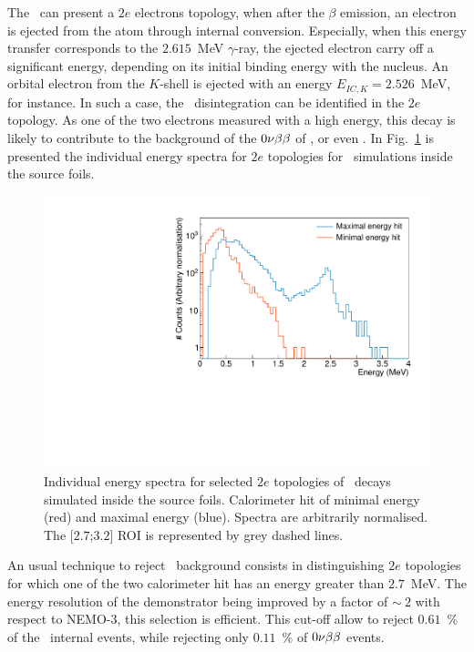 The \Tl\ can present a $2e$ electrons topology, when after the $\beta$ emission, an electron is ejected from the atom through internal conversion.
Especially, when this energy transfer corresponds to the $2.615$~MeV $\gamma$-ray, the ejected electron carry off a significant energy, depending on its initial binding energy with the nucleus.
An orbital electron from the $K$-shell is ejected with an energy $E_{IC,K}=2.526$~MeV, for instance.
In such a case, the \Tl\ disintegration can be identified in the $2e$ topology.
As one of the two electrons measured with a high energy, this decay is likely to contribute to the background of the $0\nu\beta\beta$ of \Se, or even \Nd.
In Fig.~\ref{fig:Emin_Emax_Tl} is presented the individual energy spectra for $2e$ topologies for \Tl\ simulations inside the source foils.
\begin{figure}[!h]
  \centering
  \includegraphics[width=13cm]{timedifference/fig_timediff/energy_spect_min_max_208Tl.pdf}
  \caption{Individual energy spectra for selected $2e$ topologies of \Tl\ decays simulated inside the source foils.
    Calorimeter hit of minimal energy (red) and maximal energy (blue).
    Spectra are arbitrarily normalised.
    The [$2.7$;$3.2$] ROI is represented by grey dashed lines.
    \label{fig:Emin_Emax_Tl}}
\end{figure}
An usual technique to reject \Tl\ background consists in distinguishing $2e$ topologies for which one of the two calorimeter hit has an energy greater than $2.7$~MeV.
The energy resolution of the demonstrator being improved by a factor of $\sim~2$ with respect to NEMO-$3$, this selection is efficient.
This cut-off allow to reject $0.61$~\% of the \Tl\ internal events, while rejecting only $0.11$~\% of $0\nu\beta\beta$ events.

